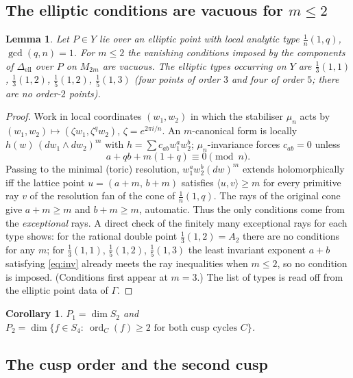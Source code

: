 \documentclass[11pt]{article}
\newtheorem{lemma}[theorem]{Lemma}
\newtheorem{corollary}[theorem]{Corollary}
\theoremstyle{definition}
\DeclareMathOperator{\ord}{ord}
\begin{document}
\subsection{The elliptic conditions are vacuous for $m\le2$}

\begin{lemma}\label{lem:toric}
Let $P\in Y$ lie over an elliptic point with local analytic type
$\tfrac1n(1,q)$, $\gcd(q,n)=1$. For $m\le2$ the vanishing conditions imposed by
the components of $\Delta_{\mathrm{ell}}$ over $P$ on $M_{2m}$ are vacuous. The
elliptic types occurring on $Y$ are $\tfrac13(1,1)$,
$\tfrac13(1,2)$, $\tfrac15(1,2)$, $\tfrac15(1,3)$ (four points of order $3$
and four of order $5$; there are no order-$2$ points).
\end{lemma}

\begin{proof}
Work in local coordinates $(w_1,w_2)$ in which the stabiliser
$\mu_n$ acts by $(w_1,w_2)\mapsto(\zeta w_1,\zeta^q w_2)$, $\zeta=e^{2\pi
i/n}$. An $m$-canonical form is locally $h(w)\,(dw_1\wedge dw_2)^m$ with
$h=\sum c_{ab}w_1^aw_2^b$; $\mu_n$-invariance forces $c_{ab}=0$ unless
\begin{equation}\label{eq:inv}
  a+qb+m(1+q)\equiv 0 \pmod n .
\end{equation}
Passing to the minimal (toric) resolution, $w_1^aw_2^b(dw)^m$ extends
holomorphically iff the lattice point $u=(a+m,\,b+m)$ satisfies
$\langle u,v\rangle\ge m$ for every primitive ray $v$ of the resolution fan of
the cone of $\tfrac1n(1,q)$. The rays of the original cone give
$a+m\ge m$ and $b+m\ge m$, automatic. Thus the only conditions come from the
\emph{exceptional} rays. A direct check of the finitely many exceptional rays
for each type shows: for the rational double point
$\tfrac13(1,2)=A_2$ there are no conditions for any $m$; for $\tfrac13(1,1)$,
$\tfrac15(1,2)$, $\tfrac15(1,3)$ the least invariant exponent $a+b$ satisfying
\eqref{eq:inv} already meets the ray inequalities when $m\le2$, so no
condition is imposed. (Conditions first appear at $m=3$.) The list of types is
read off from the elliptic point data of $\Gamma$.
\end{proof}

\begin{corollary}\label{cor:P2cusp}
$P_1=\dim S_2$ and $P_2=\dim\{f\in S_4:\ \ord_C(f)\ge2\text{ for both cusp
cycles }C\}$.
\end{corollary}

\subsection{The cusp order and the second cusp}
\end{document}
